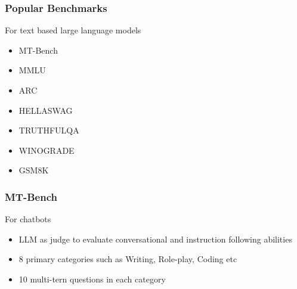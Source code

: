 
\begin{frame}[fragile]\frametitle{Popular Benchmarks}
For text based large language models

  \begin{itemize}
    \item MT-Bench
	\item MMLU
	\item ARC
	\item HELLASWAG
	\item TRUTHFULQA
	\item WINOGRADE
	\item GSM8K
  \end{itemize}
\end{frame}

\begin{frame}[fragile]\frametitle{MT-Bench}
For chatbots
  \begin{itemize}
    \item LLM as judge to evaluate conversational and instruction following abilities
	\item 8 primary categories such as Writing, Role-play, Coding etc
	\item 10 multi-tern questions in each category
  \end{itemize}
\end{frame}

